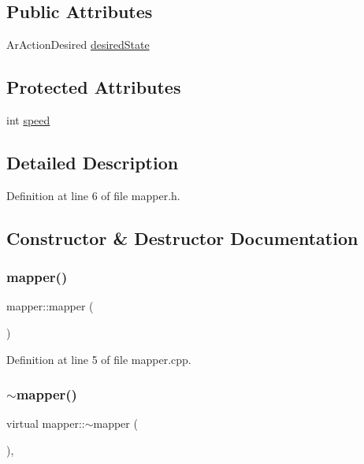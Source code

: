 \subsection*{Public Attributes}
\begin{DoxyCompactItemize}
\item 
Ar\+Action\+Desired \mbox{\hyperlink{classmapper_ad12cf719b7ef6c4399ca718cdc9f270d}{desired\+State}}
\end{DoxyCompactItemize}
\subsection*{Protected Attributes}
\begin{DoxyCompactItemize}
\item 
int \mbox{\hyperlink{classmapper_a2764f9fead6392132485f3545c18b629}{speed}}
\end{DoxyCompactItemize}


\subsection{Detailed Description}


Definition at line 6 of file mapper.\+h.



\subsection{Constructor \& Destructor Documentation}
\mbox{\label{classmapper_a63253379db55193ffc58434c32657270}} 
\subsubsection{\texorpdfstring{mapper()}{mapper()}}
{\footnotesize\ttfamily mapper\+::mapper (\begin{DoxyParamCaption}{ }\end{DoxyParamCaption})}



Definition at line 5 of file mapper.\+cpp.

\mbox{\label{classmapper_aab426a3eb8681cf2c1137f658a6802a4}} 
\subsubsection{\texorpdfstring{$\sim$mapper()}{~mapper()}}
{\footnotesize\ttfamily virtual mapper\+::$\sim$mapper (\begin{DoxyParamCaption}{ }\end{DoxyParamCaption})\hspace{0.3cm}{\ttfamily [inline]}, {\ttfamily [virtual]}}




